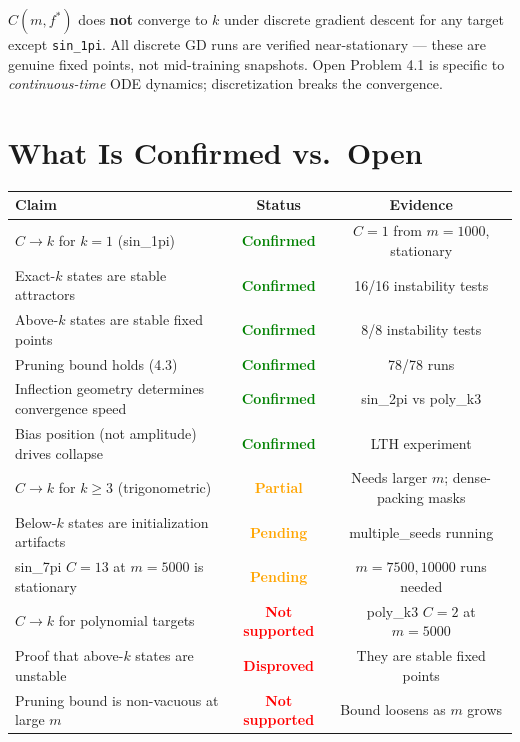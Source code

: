 \documentclass[11pt, letterpaper]{article}
\begin{document}
$C(m,f^*)$ does \textbf{not} converge to $k$ under discrete gradient descent for any target
except \texttt{sin\_1pi}. All discrete GD runs are verified near-stationary --- these are
genuine fixed points, not mid-training snapshots. Open Problem 4.1 is specific to
\emph{continuous-time} ODE dynamics; discretization breaks the convergence.

\section*{What Is Confirmed vs.\ Open}

\begin{center}
\begin{tabular}{p{5.5cm}cc}
\toprule
Claim & Status & Evidence \\
\midrule
$C\to k$ for $k=1$ (sin\_1pi) & \textcolor{green}{\textbf{Confirmed}} & $C=1$ from $m=1000$, stationary \\
Exact-$k$ states are stable attractors & \textcolor{green}{\textbf{Confirmed}} & 16/16 instability tests \\
Above-$k$ states are stable fixed points & \textcolor{green}{\textbf{Confirmed}} & 8/8 instability tests \\
Pruning bound holds (4.3) & \textcolor{green}{\textbf{Confirmed}} & 78/78 runs \\
Inflection geometry determines convergence speed & \textcolor{green}{\textbf{Confirmed}} & sin\_2pi vs poly\_k3 \\
Bias position (not amplitude) drives collapse & \textcolor{green}{\textbf{Confirmed}} & LTH experiment \\
\midrule
$C\to k$ for $k\geq 3$ (trigonometric) & \textcolor{orange}{\textbf{Partial}} & Needs larger $m$; dense-packing masks \\
Below-$k$ states are initialization artifacts & \textcolor{orange}{\textbf{Pending}} & multiple\_seeds running \\
sin\_7pi $C=13$ at $m=5000$ is stationary & \textcolor{orange}{\textbf{Pending}} & $m=7500,10000$ runs needed \\
$C\to k$ for polynomial targets & \textcolor{red}{\textbf{Not supported}} & poly\_k3 $C=2$ at $m=5000$ \\
Proof that above-$k$ states are unstable & \textcolor{red}{\textbf{Disproved}} & They are stable fixed points \\
Pruning bound is non-vacuous at large $m$ & \textcolor{red}{\textbf{Not supported}} & Bound loosens as $m$ grows \\
\bottomrule
\end{tabular}
\end{center}
\end{document}
